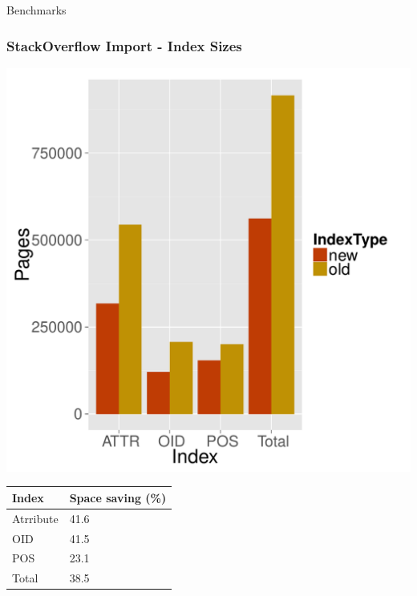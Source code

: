 \documentclass{beamer}
\begin{document}
\begin{section}{Benchmarks}
    \begin{frame}
      \frametitle{StackOverflow Import - Index Sizes}
      \begin{minipage}{0.4\textwidth}
        \includegraphics[scale=0.32]{images/SO_sizes.pdf} 
      \end{minipage}
      \quad
      \quad
      \quad
      \quad
      \begin{minipage}{0.4\textwidth}
        \begin{tabular}{ l | l }
          \textbf{Index} & \textbf{Space saving} (\%) \\ \hline 
            Atrribute & 41.6   \\ 
            OID & 41.5   \\ 
            POS & 23.1   \\
            Total & 38.5   \\
        \end{tabular}
      \end{minipage}
    \end{frame}
    

\end{section}
\end{document}
